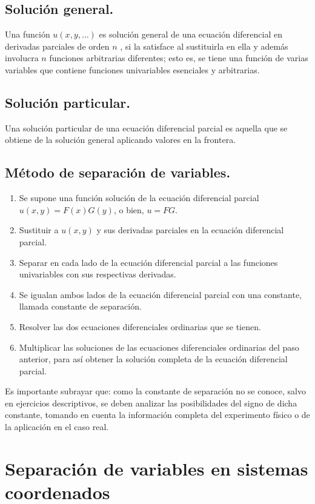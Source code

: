 \subsection{Solución general.}
Una función $u(x,y,\ldots)$ es solución general de una ecuación diferencial en derivadas parciales de orden $n$ , si la satisface al sustituirla en ella y además involucra $n$ funciones arbitrarias diferentes; esto es, se tiene una función de varias variables que contiene funciones univariables esenciales y arbitrarias.
\subsection{Solución particular.}
Una solución particular de una ecuación diferencial parcial es aquella que se obtiene de la solución general aplicando valores en la frontera.
\\
\subsection{Método de separación de variables.}
\begin{enumerate}
\item Se supone una función solución de la ecuación diferencial parcial $u(x,y) = F(x)G(y)$, o bien, $u=FG$.
\item Sustituir a $u(x,y)$ y sus derivadas parciales en la ecuación diferencial parcial.
\item Separar en cada lado de la ecuación diferencial parcial a las funciones univariables con sus respectivas derivadas.
\item Se igualan ambos lados de la ecuación diferencial parcial con una constante, llamada constante de separación.
\item Resolver las dos ecuaciones diferenciales ordinarias que se tienen.
\item Multiplicar las soluciones de las ecuaciones diferenciales ordinarias del paso anterior, para así obtener la solución completa de la ecuación diferencial parcial.
\end{enumerate}
Es importante subrayar que: como la constante de separación no se conoce, salvo en ejercicios descriptivos, se deben analizar las posibilidades del signo de dicha constante, tomando en cuenta la información completa del experimento físico o de la aplicación en el caso real.
\section{Separación de variables en sistemas coordenados}
